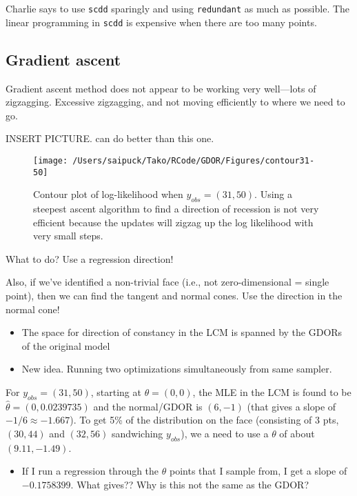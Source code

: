 \documentclass{amsbook}
\theoremstyle{definition}
\theoremstyle{remark}
\begin{document}
Charlie says to use \texttt{scdd} sparingly and using \texttt{redundant} as much as possible.  The linear programming in \texttt{scdd} is expensive when there are too many points.

\subsection{Gradient ascent}
Gradient ascent method does not appear to be working very well---lots of zigzagging.  Excessive 
zigzagging, and not moving efficiently to where we need to go.  

INSERT PICTURE.  can do better than this one.
\begin{figure}[!h]
\centering
\texttt{[image: /Users/saipuck/Tako/RCode/GDOR/Figures/contour31-50]}
\caption{Contour plot of log-likelihood when $y_{obs} = (31, 50)$.  Using a steepest 
ascent algorithm to find a direction of recession is not very efficient because the 
updates will zigzag up the log likelihood with very small steps.}
\end{figure}

What to do?  Use a regression direction!

Also, if we've identified a non-trivial face (i.e., not zero-dimensional = single point), then we can find the tangent and normal cones.  Use the direction in the normal cone!

\begin{itemize}
\item The space for direction of constancy in the LCM is spanned by the GDORs of the 
original model
\item New idea.  Running two optimizations simultaneously from same sampler.
\end{itemize}

For $y_{obs} = 
(31,50)$, starting at $\theta = (0,0)$, the MLE in the LCM is found to be $\hat{\theta} 
= (0, 0.0239735)$ and the normal/GDOR is $(6, -1)$ (that gives a slope of $-1/6 \approx 
-1.667$).  To get 5\% of the distribution on the face (consisting of 3 pts, $(30,44)$ 
and $(32,56)$ sandwiching $y_{obs}$), we a need to use a $\theta$ of about $(9.11, 
-1.49)$.

\begin{itemize}
\item If I run a regression through the $\theta$ points that I sample from, I get a 
slope of $-0.1758399$.  What gives??  Why is this not the same as the GDOR?
\end{itemize}
\end{document}
